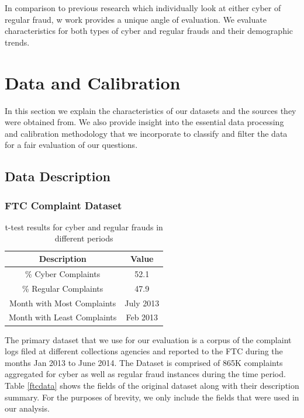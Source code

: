 \documentclass[conference]{IEEEtran}
\begin{document}
In comparison to previous research which individually look at either cyber of regular fraud, w work provides a unique angle of evaluation. We evaluate characteristics for both types of cyber and regular frauds and their demographic trends.

\section{Data and Calibration} \label{data-cal}

In this section we explain the characteristics of our datasets and the sources they were obtained from. We also provide insight into the essential data processing and calibration methodology that we incorporate to classify and filter the data for a fair evaluation of our questions.

\subsection{Data Description}

\subsubsection{FTC Complaint Dataset}

\begin{table}[h]
\centering
\begin{tabular}{c|c}
\hline
{\bfseries Description} & \multicolumn{1}{c}{\bfseries Value}
\\
\hline
\hline
\% Cyber Complaints &52.1\\
\hline
\% Regular Complaints & 47.9\\
\hline
Month with Most Complaints & July 2013\\
\hline
Month with Least Complaints & Feb 2013\\
\hline
\end{tabular}
\vspace{8pt}
\caption{t-test results for cyber and regular frauds in different periods}\label{ttest}
\vspace{-10pt}
\end{table}


The primary dataset that we use for our evaluation is a corpus of the complaint logs filed at different collections agencies and reported to the FTC during the months Jan 2013 to June 2014. The Dataset is comprised of 865K complaints aggregated for cyber as well as regular fraud instances during the time period. Table \ref{ftcdata} shows the fields of the original dataset along with their description summary. For the purposes of brevity, we only include the fields that were used in our analysis.
\\
\end{document}
